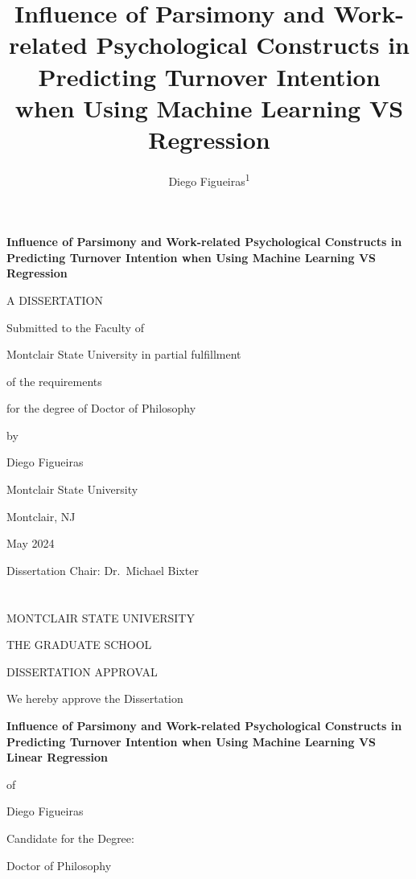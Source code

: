 \documentclass[
  man]{apa7}
\title{Influence of Parsimony and Work-related Psychological Constructs in Predicting Turnover Intention when Using Machine Learning VS Regression}
\author{Diego Figueiras\textsuperscript{1}}
\date{}
\affiliation{\vspace{0.5cm}\textsuperscript{1} Montclai State University}
\begin{document}
\maketitle

\renewcommand{\headrulewidth}{0pt}
\renewcommand{\footrulewidth}{0pt}
\phantom{i'm a ghost}
\vskip 1.0in
\begin{center}

\textbf{Influence of Parsimony and Work-related Psychological Constructs in Predicting Turnover Intention when Using Machine Learning VS Regression}

\vskip 0.8in

A DISSERTATION

\vskip 0.8in

Submitted to the Faculty of

Montclair State University in partial fulfillment

of the requirements

for the degree of Doctor of Philosophy

\vskip 0.4in

by

Diego Figueiras

Montclair State University

Montclair, NJ

May 2024

\end{center}

\vskip 1.0in

Dissertation Chair: Dr.~Michael Bixter

\newpage

\section{}
\cfoot{}
\rhead{\thepage}

\renewcommand{\headrulewidth}{0pt}
\renewcommand{\footrulewidth}{0pt}

\onehalfspacing

\begin{center}

MONTCLAIR STATE UNIVERSITY

THE GRADUATE SCHOOL

DISSERTATION APPROVAL

\vskip 0.2in

We hereby approve the Dissertation

\vskip 0.2in

\textbf{Influence of Parsimony and Work-related Psychological Constructs in Predicting Turnover Intention when Using Machine Learning VS Linear Regression}

of

Diego Figueiras

Candidate for the Degree:

Doctor of Philosophy

\end{center}
\end{document}
